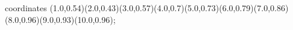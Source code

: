 					coordinates { (1.0,0.54)(2.0,0.43)(3.0,0.57)(4.0,0.7)(5.0,0.73)(6.0,0.79)(7.0,0.86)(8.0,0.96)(9.0,0.93)(10.0,0.96)};